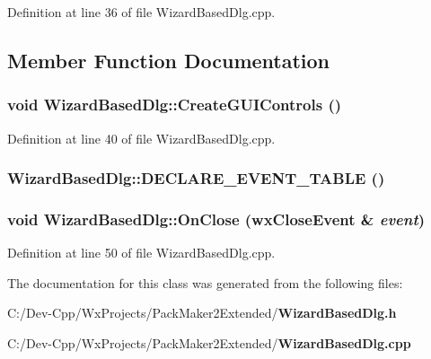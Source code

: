 Definition at line 36 of file Wizard\-Based\-Dlg.cpp.

\subsection{Member Function Documentation}
\subsubsection{\setlength{\rightskip}{0pt plus 5cm}void Wizard\-Based\-Dlg::Create\-GUIControls ()\hspace{0.3cm}{\tt  [private]}}\label{class_wizard_based_dlg_fa47e714d17294d531f15cce544d51f1}




Definition at line 40 of file Wizard\-Based\-Dlg.cpp.
\subsubsection{\setlength{\rightskip}{0pt plus 5cm}Wizard\-Based\-Dlg::DECLARE\_\-EVENT\_\-TABLE ()\hspace{0.3cm}{\tt  [private]}}\label{class_wizard_based_dlg_c024ce9bc744e3c1ec81949fa95c6d9c}


\subsubsection{\setlength{\rightskip}{0pt plus 5cm}void Wizard\-Based\-Dlg::On\-Close (wx\-Close\-Event \& {\em event})\hspace{0.3cm}{\tt  [private]}}\label{class_wizard_based_dlg_25db9f6200041b8f65853baaf0abd2a9}




Definition at line 50 of file Wizard\-Based\-Dlg.cpp.

The documentation for this class was generated from the following files:\begin{CompactItemize}
\item 
C:/Dev-Cpp/Wx\-Projects/Pack\-Maker2Extended/{\bf Wizard\-Based\-Dlg.h}\item 
C:/Dev-Cpp/Wx\-Projects/Pack\-Maker2Extended/{\bf Wizard\-Based\-Dlg.cpp}\end{CompactItemize}
